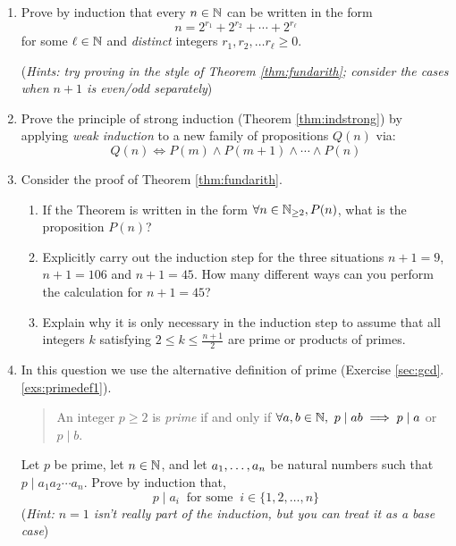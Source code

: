 \begin{exercises}{}{}
\begin{enumerate}
	
		
		
		\item Prove by induction that every $n\in\mathbb{N}$ can be written in the form
	  \[
	    n=2^{r_1}+2^{r_2}+\cdots+2^{r_\ell}
	  \]
	  for some $\ell\in\mathbb{N}$ and \emph{distinct} integers $r_1,r_2,\ldots r_\ell \ge 0$.\par
	  (\emph{Hints: try proving in the style of Theorem \ref{thm:fundarith}; consider the cases when $n+1$ is even/odd separately})
	
	
		\item\label{exs:strongindproof} Prove the principle of strong induction (Theorem \ref{thm:indstrong}) by applying \emph{weak induction} to a new family of propositions $Q(n)$ via:
		\[
			Q(n)\iff P(m)\wedge P(m+1)\wedge\cdots\wedge P(n)
		\]
	
	
		\item Consider the proof of Theorem \ref{thm:fundarith}.
		\begin{enumerate}
	  	\item If the Theorem is written in the form $\forall n\in\mathbb{N}_{\ge 2}, P(n)$, what is the proposition $P(n)$?
	  	\item Explicitly carry out the induction step for the three situations $n+1=9$, $n+1=106$ and $n+1=45$. How many different ways can you perform the calculation for $n+1=45$? 
	  	\item Explain why it is only necessary in the induction step to assume that all integers $k$ satisfying $2\le k\le\frac{n+1}2$ are prime or products of primes.
		\end{enumerate}

		\item\label{exs:primedef2} In this question we use the alternative definition of prime (Exercise \ref*{sec:gcd}.\ref{exs:primedef1}).\footnotemark
		\begin{quote}
			An integer $p\ge 2$ is \emph{prime} if and only if $\forall a,b\in\mathbb{N},\ p\mid ab\implies p\mid a$ or $p\mid b$.
		\end{quote}
		Let $p$ be prime, let $n\in\mathbb{N}$, and let ${a}_1,\ldots,{a}_{n}$ be natural numbers such that $p\mid a_1a_2\cdots a_n$. Prove by induction that,
		\[
			p\mid a_i\ \text{ for some }\ i\in\{1,2,\ldots,n\}
		\]
	  (\emph{Hint: $n=1$ isn't really part of the induction, but you can treat it as a base case})
	  

\end{enumerate}
\end{exercises}
